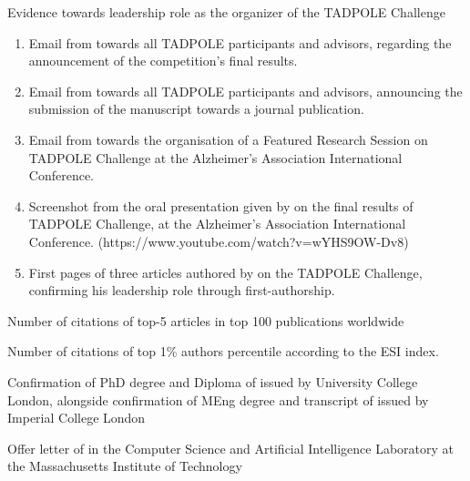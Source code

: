\documentclass[11pt]{article}
\begin{document}
\begin{thebibliography}{9}
Evidence towards \drs leadership role as the organizer of the TADPOLE Challenge
\begin{enumerate}
\item Email from \dr towards all TADPOLE participants and advisors, regarding the announcement of the competition's final results.
\item Email from \dr towards all TADPOLE participants and advisors, announcing the submission of the manuscript towards a journal publication.
\item Email from \dr towards the organisation of a Featured Research Session on TADPOLE Challenge at the Alzheimer's Association International Conference.
\item Screenshot from the oral presentation given by \dr on the final results of TADPOLE Challenge, at the Alzheimer's Association International Conference. (https://www.youtube.com/watch?v=wYHS9OW-Dv8)
\item First pages of three articles authored by \dr on the TADPOLE Challenge, confirming his leadership role through first-authorship.
\end{enumerate}

Number of citations of top-5 articles in top 100 publications worldwide
 
Number of citations of top 1\% authors percentile according to the ESI index.

Confirmation of PhD degree and Diploma of \dr issued by University College London, alongside confirmation of MEng degree and transcript of \dr issued by Imperial College London

Offer letter of \dr in the Computer Science and Artificial Intelligence Laboratory at the Massachusetts Institute of Technology


\end{thebibliography}
\end{document}
